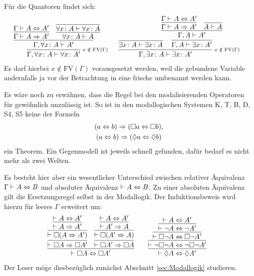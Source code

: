 \begin{Beweis}
Für die Quantoren findet sich:
\[
\begin{array}{@{}l@{\quad\;\;}l}
\infer[\infernote{$x\notin\mathrm{FV}(\Gamma)$}]{\Gamma,\forall x\colon A\vdash\forall x\colon A'}{
  \infer{\Gamma,\forall x\colon A\vdash A'}{
    \infer{\Gamma\vdash A\cond A'}{\Gamma\vdash A\bicond A'}
  & \infer{\forall x\colon A\vdash A}{
      \infer{\forall x\colon A\vdash\forall x\colon A}{}}}}
&
\infer[\infernote{$x\notin\mathrm{FV}(\Gamma)$}]{\Gamma,\exists x\colon A\vdash\exists x\colon A'}{
  \infer{\exists x\colon A\vdash\exists x\colon A}{}\hspace{-12pt}
& \infer{\Gamma, A\vdash\exists x\colon A'}{
    \infer{\Gamma, A\vdash A'}{
      \infer{\Gamma\vdash A\cond A'}{
        \Gamma\vdash A\bicond A'}
    & \infer{A\vdash A}{}}}}
\end{array}
\]
Es darf hierbei $x\notin\mathrm{FV}(\Gamma)$ vorausgesetzt werden, weil
die gebundene Variable andernfalls ja vor der Betrachtung in eine
frische umbenannt werden kann.\,\qedsymbol
\end{Beweis}

\noindent
Es wäre noch zu erwähnen, dass die Regel bei den modalisierenden
Operatoren für gewöhnlich unzulässig ist. So ist in den modallogischen
Systemen K, T, B, D, S4, S5 keine der Formeln
\begin{gather*}
(a\Leftrightarrow b)\Rightarrow (\Box a\Leftrightarrow\Box b),\\
(a\Leftrightarrow b)\Rightarrow (\Diamond a\Leftrightarrow\Diamond b)
\end{gather*}
ein Theorem. Ein Gegenmodell ist jeweils schnell gefunden, dafür
bedarf es nicht mehr als zwei Welten.

Es besteht hier aber ein wesentlicher Unterschied zwischen relativer
Äquivalenz $\Gamma\vdash A\Leftrightarrow B$ und absoluter Äquivalenz
$\vdash A\Leftrightarrow B$. Zu einer absoluten Äquivalenz gilt die Ersetzungsregel
selbst in der Modallogik. Der Induktionsbeweis wird hierzu für leeres
$\Gamma$ erweitert um:
\[
\begin{array}{@{}l@{\qquad}l}
\infer{\vdash\lnec A\bicond\lnec A'}{
  \infer{\vdash\lnec A\cond\lnec A'}{
    \infer{\vdash\lnec(A\cond A')}{
      \infer{\vdash A\cond A'}{\vdash A\bicond A'}}}
& \infer{\vdash\lnec A'\cond\lnec A}{
    \infer{\vdash\lnec(A'\cond A)}{
      \infer{\vdash A'\cond A}{\vdash A\bicond A'}}}}
&
\infer{\vdash\lpos A\bicond\lpos A'}{
  \infer{\vdash\lnot\lnec\lnot A\bicond\lnot\lnec\lnot A'}{
    \infer{\vdash\lnec\lnot A\bicond\lnec\lnot A'}{
      \infer{\vdash\lnot A\bicond\lnot A'}{
        \vdash A\bicond A'}}}}
\end{array}
\]
Der Leser möge diesbezüglich zunächst Abschnitt \ref{sec:Modallogik} studieren.
